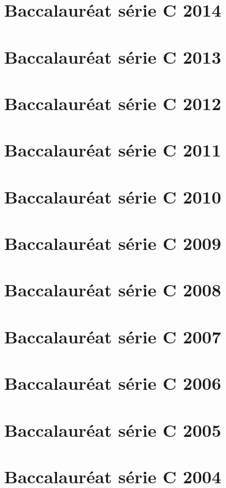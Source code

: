 \section{Baccalauréat série C 2014}

\newpage
\section{Baccalauréat série C 2013}

\newpage
\section{Baccalauréat série C 2012}

\newpage
\section{Baccalauréat série C 2011}

\newpage
\section{Baccalauréat série C 2010}

\newpage
\section{Baccalauréat série C 2009}

\newpage
\section{Baccalauréat série C 2008}

\newpage
\section{Baccalauréat série C 2007}

\newpage
\section{Baccalauréat série C 2006}

\newpage
\section{Baccalauréat série C 2005}

\newpage
\section{Baccalauréat série C 2004}

\newpage
